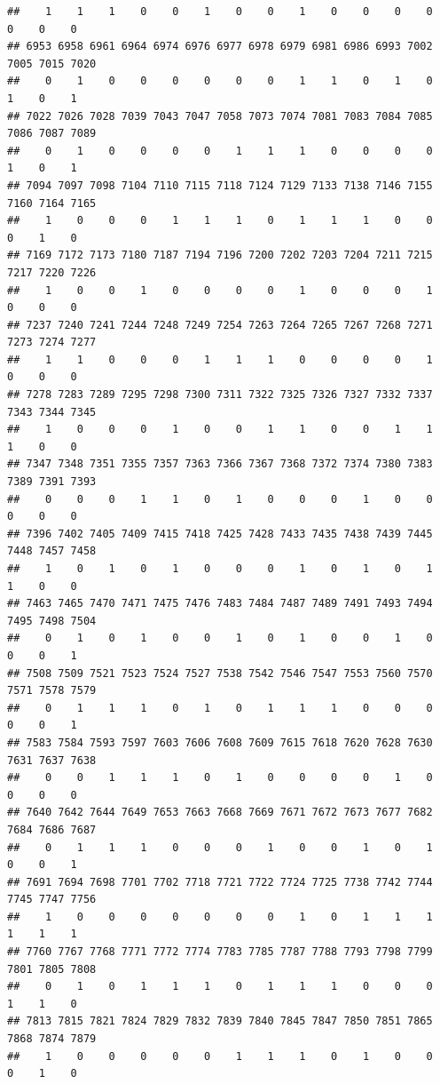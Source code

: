 \documentclass[
]{article}
\begin{document}
\begin{verbatim}
##    1    1    1    0    0    1    0    0    1    0    0    0    0    0    0    0 
## 6953 6958 6961 6964 6974 6976 6977 6978 6979 6981 6986 6993 7002 7005 7015 7020 
##    0    1    0    0    0    0    0    0    1    1    0    1    0    1    0    1 
## 7022 7026 7028 7039 7043 7047 7058 7073 7074 7081 7083 7084 7085 7086 7087 7089 
##    0    1    0    0    0    0    1    1    1    0    0    0    0    1    0    1 
## 7094 7097 7098 7104 7110 7115 7118 7124 7129 7133 7138 7146 7155 7160 7164 7165 
##    1    0    0    0    1    1    1    0    1    1    1    0    0    0    1    0 
## 7169 7172 7173 7180 7187 7194 7196 7200 7202 7203 7204 7211 7215 7217 7220 7226 
##    1    0    0    1    0    0    0    0    1    0    0    0    1    0    0    0 
## 7237 7240 7241 7244 7248 7249 7254 7263 7264 7265 7267 7268 7271 7273 7274 7277 
##    1    1    0    0    0    1    1    1    0    0    0    0    1    0    0    0 
## 7278 7283 7289 7295 7298 7300 7311 7322 7325 7326 7327 7332 7337 7343 7344 7345 
##    1    0    0    0    1    0    0    1    1    0    0    1    1    1    0    0 
## 7347 7348 7351 7355 7357 7363 7366 7367 7368 7372 7374 7380 7383 7389 7391 7393 
##    0    0    0    1    1    0    1    0    0    0    1    0    0    0    0    0 
## 7396 7402 7405 7409 7415 7418 7425 7428 7433 7435 7438 7439 7445 7448 7457 7458 
##    1    0    1    0    1    0    0    0    1    0    1    0    1    1    0    0 
## 7463 7465 7470 7471 7475 7476 7483 7484 7487 7489 7491 7493 7494 7495 7498 7504 
##    0    1    0    1    0    0    1    0    1    0    0    1    0    0    0    1 
## 7508 7509 7521 7523 7524 7527 7538 7542 7546 7547 7553 7560 7570 7571 7578 7579 
##    0    1    1    1    0    1    0    1    1    1    0    0    0    0    0    1 
## 7583 7584 7593 7597 7603 7606 7608 7609 7615 7618 7620 7628 7630 7631 7637 7638 
##    0    0    1    1    1    0    1    0    0    0    0    1    0    0    0    0 
## 7640 7642 7644 7649 7653 7663 7668 7669 7671 7672 7673 7677 7682 7684 7686 7687 
##    0    1    1    1    0    0    0    1    0    0    1    0    1    0    0    1 
## 7691 7694 7698 7701 7702 7718 7721 7722 7724 7725 7738 7742 7744 7745 7747 7756 
##    1    0    0    0    0    0    0    0    1    0    1    1    1    1    1    1 
## 7760 7767 7768 7771 7772 7774 7783 7785 7787 7788 7793 7798 7799 7801 7805 7808 
##    0    1    0    1    1    1    0    1    1    1    0    0    0    1    1    0 
## 7813 7815 7821 7824 7829 7832 7839 7840 7845 7847 7850 7851 7865 7868 7874 7879 
##    1    0    0    0    0    0    1    1    1    0    1    0    0    0    1    0 

\end{verbatim}
\end{document}
